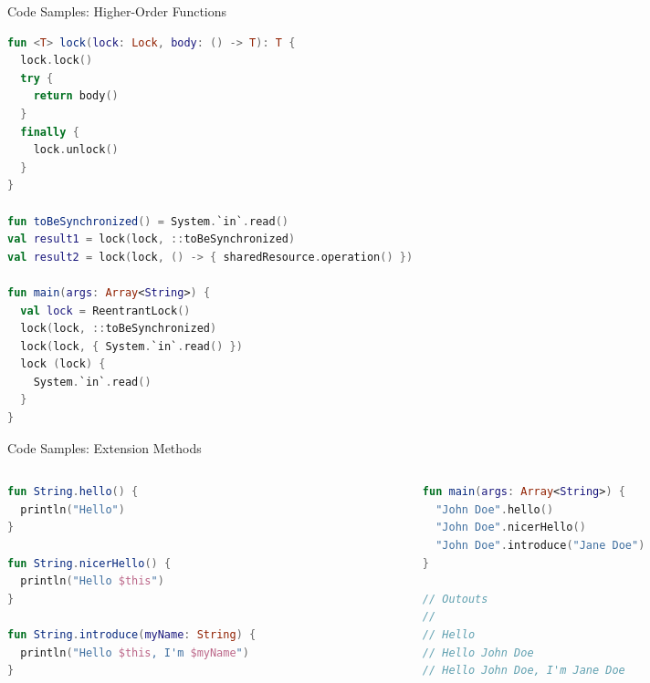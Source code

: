 \begin{frame}[fragile]{Code Samples: Higher-Order Functions}

\begin{lstlisting}[language=Kotlin,basicstyle=\ttfamily\scriptsize]
fun <T> lock(lock: Lock, body: () -> T): T {
  lock.lock()
  try {
    return body()
  }
  finally {
    lock.unlock()
  }
}

fun toBeSynchronized() = System.`in`.read()
val result1 = lock(lock, ::toBeSynchronized)
val result2 = lock(lock, () -> { sharedResource.operation() })

fun main(args: Array<String>) {
  val lock = ReentrantLock()
  lock(lock, ::toBeSynchronized)
  lock(lock, { System.`in`.read() })
  lock (lock) {
    System.`in`.read()
  }
}
\end{lstlisting}
\end{frame}

\begin{frame}[fragile]{Code Samples: Extension Methods}
	\begin{columns}
		\begin{column}{0.5\textwidth}
\begin{lstlisting}[language=Kotlin,basicstyle=\ttfamily\scriptsize]
fun String.hello() {
  println("Hello")
}

fun String.nicerHello() {
  println("Hello $this")
}

fun String.introduce(myName: String) {
  println("Hello $this, I'm $myName")
}
\end{lstlisting}
		\end{column}
		\begin{column}{0.5\textwidth}
\begin{lstlisting}[language=Kotlin,basicstyle=\ttfamily\scriptsize]
fun main(args: Array<String>) {
  "John Doe".hello()
  "John Doe".nicerHello()
  "John Doe".introduce("Jane Doe")
}

// Outouts
//
// Hello
// Hello John Doe
// Hello John Doe, I'm Jane Doe
\end{lstlisting}
		\end{column}
	\end{columns}
\end{frame}

